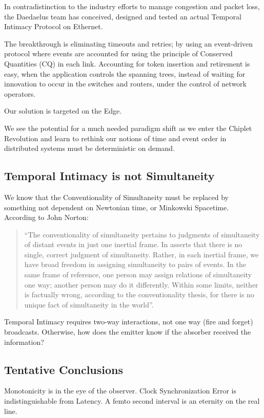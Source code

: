 \documentclass[../../../OAE-SPEC-MAIN.tex]{subfiles}
\begin{document}
In contradistinction to the industry efforts to manage congestion and packet loss, the Daedaelus team has conceived, designed and tested an actual Temporal Intimacy Protocol on Ethernet.

The breakthrough is eliminating timeouts and retries; by using an event-driven protocol where events are accounted for using the principle of Conserved Quantities (CQ) in each link. Accounting for token insertion and retirement is easy, when the application controls the spanning trees, instead of waiting for innovation to occur in the switches and routers, under the control of network operators.

Our solution is targeted on the Edge.

We see the potential for a much needed paradigm shift as we enter the Chiplet Revolution and learn to rethink our notions of time and event order in distributed systems must be deterministic on demand.

\subsection{Temporal Intimacy is not Simultaneity}
We know that the Conventionality of Simultaneity must be replaced by something not dependent on Newtonian time, or Minkowski Spacetime. According to John Norton:
\begin{quote}
“The conventionality of simultaneity pertains to judgments of simultaneity of distant events in just one inertial frame. In asserts that there is no single, correct judgment of simultaneity. Rather, in each inertial frame, we have broad freedom in assigning simultaneity to pairs of events. In the same frame of reference, one person may assign relations of simultaneity one way; another person may do it differently. Within some limits, neither is factually wrong, according to the conventionality thesis, for there is no unique fact of simultaneity in the world”.
\end{quote}

Temporal Intimacy requires two-way interactions, not one way (fire and forget) broadcasts. Otherwise, how does the emitter know if the absorber received the information?

\subsection{Tentative Conclusions}
Monotonicity is in the eye of the observer.
Clock Synchronization Error is indistinguishable from Latency.
A femto second interval is an eternity on the real line.
\end{document}
